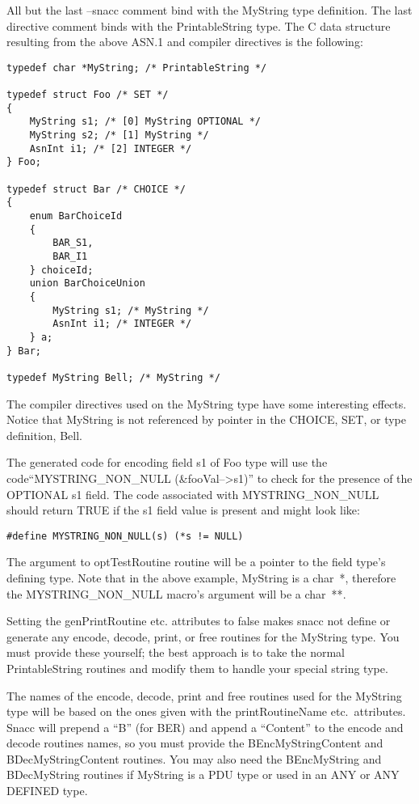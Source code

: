 All but the last {\ASN --snacc} comment bind with the {\ASN MyString} type
definition. The last directive comment binds with the {\ASN PrintableString}
type.  The C data structure resulting from the above ASN.1 and compiler
directives is the following:
\begin{small}
\begin{verbatim}
typedef char *MyString; /* PrintableString */

typedef struct Foo /* SET */
{
    MyString s1; /* [0] MyString OPTIONAL */
    MyString s2; /* [1] MyString */
    AsnInt i1; /* [2] INTEGER */
} Foo;

typedef struct Bar /* CHOICE */
{
    enum BarChoiceId
    {
        BAR_S1,
        BAR_I1
    } choiceId;
    union BarChoiceUnion
    {
        MyString s1; /* MyString */
        AsnInt i1; /* INTEGER */
    } a;
} Bar;

typedef MyString Bell; /* MyString */
\end{verbatim}
\end{small}

The compiler directives used on the {\ASN MyString} type have some
interesting effects.  Notice that {\ASN MyString} is not referenced by
pointer in the CHOICE, SET, or type definition, {\ASN Bell}.

The generated code for encoding field {\C s1} of {\C Foo} type
will use the code\linebreak``{\C MYSTRING\_NON\_NULL (\&fooVal-->s1)}'' to check
for the presence of the OPTIONAL {\C s1} field.  The code associated
with MYSTRING\_NON\_NULL should return TRUE if the {\C s1} field
value is present and might look like:
\begin{verbatim}
#define MYSTRING_NON_NULL(s) (*s != NULL)
\end{verbatim}

The argument to {\C optTestRoutine} routine will be a pointer to the
field type's defining type.  Note that in the above example,
{\ASN MyString} is a {\C char~*}, therefore the {\C MYSTRING\_NON\_NULL}
macro's argument will be a {\C char~**}.

Setting the {\ASN genPrintRoutine} etc. attributes to false makes
snacc not define or generate any encode, decode, print, or free
routines for the {\ASN MyString} type.  You must provide these
yourself; the best approach is to take the normal {\ASN PrintableString}
routines and modify them to handle your special string type.

The names of the encode, decode, print and free routines used for the
{\ASN MyString} type will be based on the ones given with the
{\ASN printRoutineName} etc.\  attributes.  Snacc will prepend a
``B'' (for BER) and append a ``Content'' to the encode and decode
routines names, so you must provide the {\C BEncMyStringContent} and
{\C BDecMyStringContent} routines.  You may also need the
{\C BEncMyString} and {\C BDecMyString} routines if {\ASN MyString} is a
PDU type or used in an ANY or ANY DEFINED type.

